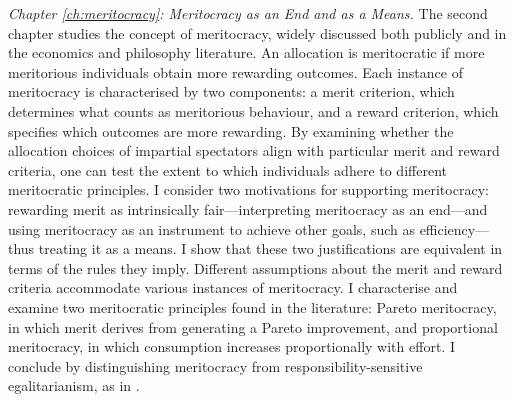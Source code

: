 \emph{Chapter \ref{ch:meritocracy}: Meritocracy as an End and as a Means.} The second chapter studies the concept of meritocracy, widely discussed both publicly and in the economics and philosophy literature. An allocation is meritocratic if more meritorious individuals obtain more rewarding outcomes. Each instance of meritocracy is characterised by two components: a merit criterion, which determines what counts as meritorious behaviour, and a reward criterion, which specifies which outcomes are more rewarding. By examining whether the allocation choices of impartial spectators align with particular merit and reward criteria, one can test the extent to which individuals adhere to different meritocratic principles. I consider two motivations for supporting meritocracy: rewarding merit as intrinsically fair—interpreting meritocracy as an end—and using meritocracy as an instrument to achieve other goals, such as efficiency—thus treating it as a means. I show that these two justifications are equivalent in terms of the rules they imply. Different assumptions about the merit and reward criteria accommodate various instances of meritocracy. I characterise and examine two meritocratic principles found in the literature: Pareto meritocracy, in which merit derives from generating a Pareto improvement, and proportional meritocracy, in which consumption increases proportionally with effort. I conclude by distinguishing meritocracy from responsibility-sensitive egalitarianism, as in \citep{fleurbaeyFairnessResponsibilityWelfare2008}.

